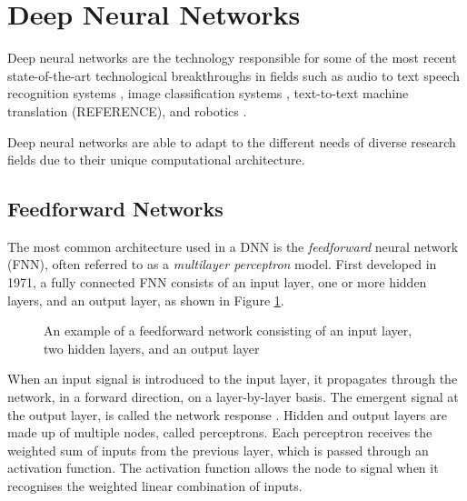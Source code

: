 \section{Deep Neural Networks}\label{dnn}
Deep neural networks are the technology responsible for some of the most recent state-of-the-art technological breakthroughs in fields such as audio to text speech recognition systems \cite{Hinton2012}, image classification systems \cite{Krizhevsky2012, Simonyan2014, Szegedy2015, He2016}, text-to-text machine translation (REFERENCE), and robotics \cite{Mnih2015, Lillicrap2015, Schulman2015, Schulman2015highdimensional}.

Deep neural networks are able to adapt to the different needs of diverse research fields due to their unique computational architecture.




\subsection{Feedforward Networks}
The most common architecture used in a DNN is the \textit{feedforward} neural network (FNN), often referred to as a \textit{multilayer perceptron} model. First developed in 1971, a fully connected FNN consists of an input layer, one or more hidden layers, and an output layer, as shown in Figure \ref{fig:2302_feedforward_network}.

\begin{figure}[h]
	\centering
	
	\caption[Feedforward network example]{An example of a feedforward network consisting of an input layer, two hidden layers, and an output layer}
	\label{fig:2302_feedforward_network}
\end{figure}

When an input signal is introduced to the input layer, it propagates through the network, in a forward direction, on a layer-by-layer basis. The emergent signal at the output layer, is called the network response \cite{Haykin99}. Hidden and output layers are made up of multiple nodes, called perceptrons. Each perceptron receives the weighted sum of inputs from the previous layer, which is passed through an activation function. The activation function allows the node to signal when it recognises the weighted linear combination of inputs.

